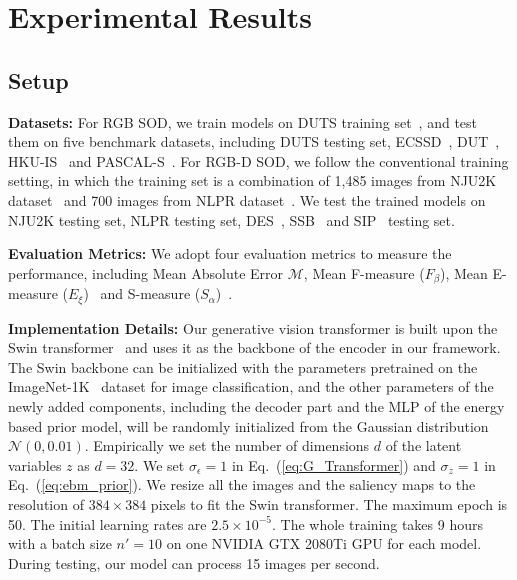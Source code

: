 \documentclass{article}
\begin{document}
\section{Experimental Results}


\subsection{Setup}
\label{setup_sec}


\noindent\textbf{Datasets:} 
For RGB SOD, we train models on DUTS training  set~\cite{imagesaliency},
and test them on five benchmark datasets, including DUTS testing set,  ECSSD~\cite{yan2013hierarchical}, DUT~\cite{Manifold-Ranking:CVPR-2013}, HKU-IS~\cite{li2015visual} and PASCAL-S~\cite{pascal_s_dataset}.
For RGB-D SOD, we follow the conventional training setting, in which the training set is a combination of 1,485 images from NJU2K
dataset~\cite{NJU2000} and 700 images from NLPR dataset~\cite{peng2014rgbd}. We test the trained models on NJU2K testing set, NLPR testing set,
DES~\cite{cheng2014depth}, SSB~\cite{niu2012leveraging} and SIP~\cite{sip_dataset} testing set.



\noindent\textbf{Evaluation Metrics:} We adopt four evaluation metrics to measure the performance, including Mean Absolute Error $\mathcal{M}$, Mean F-measure ($F_{\beta}$), Mean E-measure ($E_{\xi}$)~\cite{fan2018enhanced} and S-measure ($S_{\alpha}$)~\cite{fan2017structure}.



\noindent\textbf{Implementation Details:}
Our generative vision transformer is built upon the Swin transformer~\cite{liu2021swin}  and uses it as the backbone of the encoder in our framework. The Swin backbone can be initialized with the parameters pretrained on the ImageNet-1K~\cite{imagenet_1k} dataset for image classification, and the other parameters of the newly added components, including the decoder part and the MLP of the energy based prior model, will be randomly initialized from the Gaussian distribution $\mathcal{N}(0,0.01)$.
Empirically we set the number of dimensions $d$ of the latent variables $z$ as $d=32$. We set $\sigma_{\epsilon}=1$ in Eq.~(\ref{eq:G_Transformer})  and $\sigma_{z}=1$ in Eq.~(\ref{eq:ebm_prior}). 
We resize all the images and the saliency maps to the resolution of $384\times384$ pixels to fit the Swin transformer. The maximum epoch is 50. The initial learning rates are $2.5 \times 10^{-5}$. The whole training takes 9 hours with a batch size $n'=10$ on one NVIDIA GTX 2080Ti GPU for each model.
During testing, our model can process 15 images per second.
\end{document}
